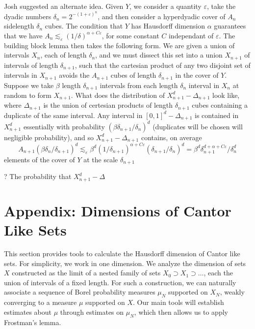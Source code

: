 \documentclass{report}
\theoremstyle{plain}
\theoremstyle{plain}
\begin{document}
Josh suggested an alternate idea. Given $Y$, we consider a quantity $\varepsilon$, take the dyadic numbers $\delta_n = 2^{-(1 + \varepsilon)^n}$, and then consider a hyperdyadic cover of $A_n$ sidelength $\delta_n$ cubes. The condition that $Y$ has Hausdorff dimension $\alpha$ guarantees that we have $A_n \lesssim_\varepsilon (1/\delta)^{\alpha + C\varepsilon}$, for some constant $C$ independant of $\varepsilon$. The building block lemma then takes the following form. We are given a union of intervals $X_n$, each of length $\delta_n$, and we must dissect this set into a union $X_{n+1}$ of intervals of length $\delta_{n+1}$, such that the cartesian product of any two disjoint set of intervals in $X_{n+1}$ avoids the $A_{n+1}$ cubes of length $\delta_{n+1}$ in the cover of $Y$. Suppose we take $\beta$ length $\delta_{n+1}$ intervals from each length $\delta_n$ interval in $X_n$ at random to form $X_{n+1}$. What does the distribution of $X_{n+1}^d - \Delta_{n+1}$ look like, where $\Delta_{n+1}$ is the union of certesian products of length $\delta_{n+1}$ cubes containing a duplicate of the same interval. Any interval in $[0,1]^d - \Delta_{n+1}$ is contained in $X_{n+1}^d$ essentially with probability $(\beta \delta_{n+1}/\delta_n)^d$ (duplicates will be chosen will negligible probability), and so $X_{n+1}^d - \Delta_{n+1}$ contains, on average
%
\[ A_{n+1} (\beta \delta_n/\delta_{n+1})^d \lesssim_\varepsilon \beta^d (1/\delta_{n+1})^{\alpha + C\varepsilon} (\delta_{n+1} / \delta_n)^d = \beta^d \delta_{n+1}^{d + \alpha + C \varepsilon} / \delta_n^d \]
%
elements of the cover of $Y$ at the scale $\delta_{n+1}$

? The probability that $X_{n+1}^d - \Delta$















\chapter{Appendix: Dimensions of Cantor Like Sets}

This section provides tools to calculate the Hausdorff dimension of Cantor like sets. For simplicity, we work in one dimension. We analyze the dimension of sets $X$ constructed as the limit of a nested family of sets $X_0 \supset X_1 \supset \dots$, each the union of intervals of a fixed length. For such a construction, we can naturally associate a sequence of Borel probability measures $\mu_N$ supported on $X_N$, weakly converging to a measure $\mu$ supported on $X$. Our main tools will establish estimates about $\mu$ through estimates on $\mu_N$, which then allows us to apply Frostman's lemma.
\end{document}
